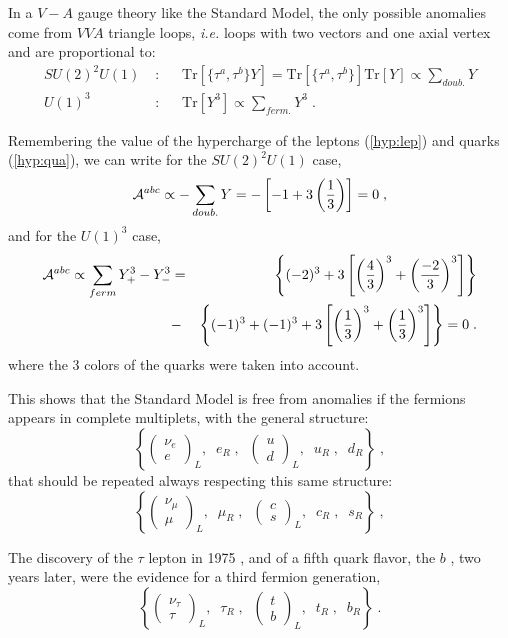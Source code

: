 \documentclass[12pt]{report}
\newcommand{\ba}{\begin{array}}
\newcommand{\ea}{\end{array}}
\begin{document}
In a $V-A$ gauge theory like the Standard Model, the only possible
anomalies come from $VVA$ triangle loops, {\it i.e.} loops with  two
vectors and one axial vertex and are proportional to:
\begin{eqnarray*}
{SU(2)^2 U(1)} \; & : & \;\;\;
\mbox{Tr} \left[ \{ \tau^a  , \tau^b \} Y \right] = 
\mbox{Tr} \left[ \{ \tau^a  , \tau^b \} \right] \mbox{Tr} \left[ Y \right] 
\propto \sum_{doub.} Y \\
{U(1)^3} \; & : &  \;\;\; 
\mbox{Tr} \left[ Y^3 \right] \propto \sum_{ferm.} Y^3 \; .
\end{eqnarray*}

Remembering the value of the hypercharge of the leptons
(\ref{hyp:lep}) and quarks (\ref{hyp:qua}), we can write for the
${SU(2)^2 U(1)}$ case,
\[
{\cal A}^{abc} \propto - \sum_{doub.} Y 
= - \left[ - 1 + { 3} \left(\frac{1}{3} \right) \right] = 0 \; ,
\]
and for the ${U(1)^3}$ case,
\begin{eqnarray*}
{\cal A}^{abc} \propto \sum_{ferm} Y^3_+ -  Y^3_- &=& 
\left\{ (-2)^3 + { 3} \left[ \left(
\frac{4}{3} \right)^3 + \left(\frac{- 2}{3}\right)^3 \right] \right\} 
\\
& - & \left\{ (-1)^3 + (-1)^3 +
{ 3} \left[ \left( \frac{1}{3} \right)^3 +  
\left( \frac{1}{3} \right)^3 \right] \right\} = 0 \; .
\end{eqnarray*}
where the 3 colors of the quarks were taken into account. 

This shows that the Standard Model is free from anomalies if the
fermions appears in complete multiplets, with the general structure: 
\[
\left\{	\left( \ba{c}
	      		 \nu_e    \\
	      		   e  
                        \ea \right)_L   ,  \;\; e_R  \; ,  \;\;
 	\left( \ba{c}
	      	  u  \\
	      	  d  
              \ea \right)_L   ,  \;\;  u_R \; ,  \;\; d_R 
\right\} \; ,
\]
that should be repeated always respecting this same structure:
\[
\left\{	\left( \ba{c}
	      		 \nu_\mu    \\
	      		 \mu  
                        \ea \right)_L   ,  \;\; \mu_R  \; ,  \;\;
 	\left( \ba{c}
	      	  c  \\
	      	  s  
              \ea \right)_L   ,  \;\;  c_R \; ,  \;\; s_R 
\right\} \; ,
\]

The discovery of the $\tau$ lepton in 1975 \cite{Perl:75}, and
of a fifth quark flavor, the $b$ \cite{Herb:77}, two years later, were
the evidence for a third fermion generation,
\[
\left\{	\left( \ba{c}
	      		 \nu_\tau    \\
	      		 \tau
                        \ea \right)_L   ,  \;\; \tau_R  \; ,  \;\;
 	\left( \ba{c}
	      	  t  \\
	      	  b  
              \ea \right)_L   ,  \;\;  t_R \; ,  \;\; b_R 
\right\} \; .
\]
\end{document}
